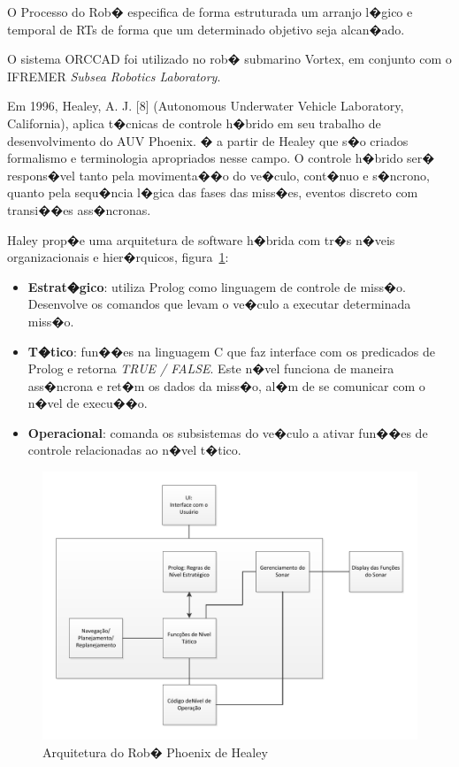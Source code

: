 O Processo do Rob� especifica de forma estruturada um arranjo l�gico e temporal
de RTs de forma que um determinado objetivo seja alcan�ado.

O sistema ORCCAD foi utilizado no rob� submarino Vortex, em conjunto com o
IFREMER \emph{Subsea Robotics Laboratory}.

Em 1996, Healey, A. J. [8] (Autonomous Underwater Vehicle Laboratory,
California), aplica t�cnicas de controle h�brido em seu trabalho de
desenvolvimento do AUV Phoenix.  � a partir de Healey
que s�o criados formalismo e terminologia apropriados nesse campo. O
controle h�brido ser� respons�vel tanto pela movimenta��o do ve�culo, cont�nuo
e s�ncrono, quanto pela sequ�ncia l�gica das fases das miss�es, eventos
discreto com transi��es ass�ncronas.  

Haley prop�e uma arquitetura de software h�brida com tr�s n�veis organizacionais
e hier�rquicos, figura~\ref{HEALEY_1}: 
\begin{itemize}
  \item \textbf{Estrat�gico}: utiliza Prolog como linguagem de controle de
  miss�o. Desenvolve os comandos que levam o ve�culo a executar determinada
  miss�o.
  \item \textbf{T�tico}: fun��es na linguagem C que faz interface com os
  predicados de Prolog e retorna \emph{TRUE / FALSE}. Este n�vel funciona de
  maneira ass�ncrona e ret�m os dados da miss�o, al�m de se comunicar com o
  n�vel de execu��o.
  \item \textbf{Operacional}: comanda os subsistemas do ve�culo a ativar fun��es
  de controle relacionadas ao n�vel t�tico.
\end{itemize}

\begin{figure}[H]
\centering
\includegraphics[width=1\columnwidth]{figs/HEALEY_1.pdf}
\caption{Arquitetura do Rob� Phoenix de Healey}
\label{HEALEY_1}
\end{figure}

